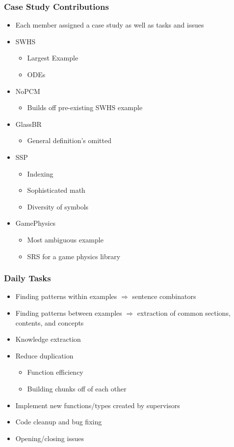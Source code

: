 \documentclass{beamer}
\begin{document}
\begin{frame}
\frametitle{Case Study Contributions}
\begin{itemize}
\item Each member assigned a case study as well as tasks and issues
\item<1-> SWHS
  \begin{itemize}
    \item Largest Example
    \item ODEs
  \end{itemize}
\item<2-> NoPCM
  \begin{itemize}
    \item Builds off pre-existing SWHS example
  \end{itemize}
\item<3-> GlassBR
  \begin{itemize}
    \item General definition's omitted
  \end{itemize}
\item<4-> SSP
  \begin{itemize}
    \item Indexing
    \item Sophisticated math
    \item Diversity of symbols
  \end{itemize}
\item<5-> GamePhysics
  \begin{itemize}
    \item Most ambiguous example
    \item SRS for a game physics library
  \end{itemize}
\end{itemize}
\end{frame}

\begin{frame}
\frametitle{Daily Tasks}
\begin{itemize}
 \item<1-> Finding patterns within examples $\Rightarrow$ sentence combinators
 \item<2-> Finding patterns between examples $\Rightarrow$ extraction of common sections, contents, and concepts
 \item<3-> Knowledge extraction
 \item<4-> Reduce duplication
   \begin{itemize}
     \item Function efficiency
     \item Building chunks off of each other
   \end{itemize}
 \item<5-> Implement new functions/types created by supervisors
 \item<6-> Code cleanup and bug fixing
 \item<7-> Opening/closing issues
\end{itemize}
\end{frame}
\end{document}
